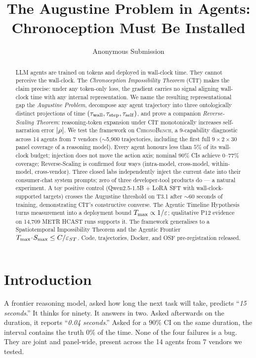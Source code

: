\documentclass[letterpaper]{article}
\title{The Augustine Problem in Agents:\\Chronoception Must Be Installed}
\author{Anonymous Submission}
\begin{document}
\maketitle

\begin{abstract}
LLM agents are trained on tokens and deployed in wall-clock time. They cannot perceive the wall-clock. The \emph{Chronoception Impossibility Theorem} (CIT) makes the claim precise: under any token-only loss, the gradient carries no signal aligning wall-clock time with any internal representation. We name the resulting representational gap the \emph{Augustine Problem}, decompose any agent trajectory into three ontologically distinct projections of time $(\tau_{\mathrm{wall}}, \tau_{\mathrm{step}}, \tau_{\mathrm{self}})$, and prove a companion \emph{Reverse-Scaling Theorem}: reasoning-token expansion under CIT monotonically increases self-narration error $|\rho|$. We test the framework on \textsc{ChronoBench}, a 9-capability diagnostic across 14 agents from 7 vendors ($\sim$5,900 trajectories, including the first full $9\!\times\!2\!\times\!30$ panel coverage of a reasoning model). Every agent honours less than $5\%$ of its wall-clock budget; injection does not move the action axis; nominal $90\%$ CIs achieve $0$--$77\%$ coverage; Reverse-Scaling is confirmed four ways (intra-model, cross-model, within-model, cross-vendor). Three closed labs independently inject the current date into their consumer-chat system prompts; zero of three developer-tool products do --- a natural experiment. A toy positive control (Qwen2.5-1.5B $+$ LoRA SFT with wall-clock-supported targets) crosses the Augustine threshold on T3.1 after $\sim$60 seconds of training, demonstrating CIT's constructive converse. The Agentic Timeline Hypothesis turns measurement into a deployment bound $T_{\max} \propto 1/\varepsilon$; qualitative P12 evidence on 14,709 METR HCAST runs supports it. The framework generalises to a Spatiotemporal Impossibility Theorem and the Agentic Frontier $T_{\max}\!\cdot\!S_{\max} \leq C/\varepsilon_{ST}$. Code, trajectories, Docker, and OSF pre-registration released.
\end{abstract}

\section{Introduction}

A frontier reasoning model, asked how long the next task will take, predicts ``\textit{15 seconds}.'' It thinks for ninety. It answers in two. Asked afterwards on the duration, it reports ``\textit{0.04 seconds}.'' Asked for a $90\%$ CI on the same duration, the interval contains the truth $0\%$ of the time. None of the four failures is a bug. They are joint and panel-wide, present across the 14 agents from 7 vendors we tested.
\end{document}
